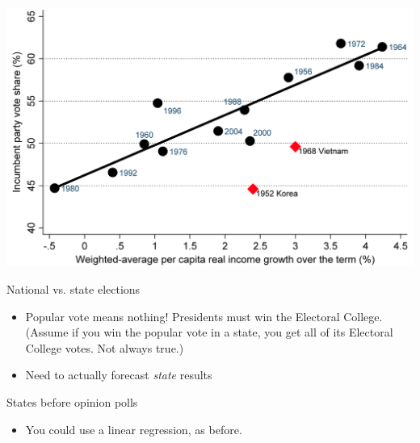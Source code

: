\documentclass[14pt, t]{beamer}
\begin{document}
\begin{frame}[c]
\begin{center}
\includegraphics[width=\textwidth]{bread-and-peace.png}
\end{center}
\end{frame}

\begin{frame}{National vs. state elections}
\begin{itemize}
	\item Popular vote means nothing! Presidents must win the Electoral College. (Assume if you win the popular vote in a state, you get all of its Electoral College votes. Not always true.)
	\item Need to actually forecast \emph{state} results
\end{itemize}
\end{frame}

\begin{frame}{States before opinion polls}
\begin{itemize}
	\item You could use a linear regression, as before.
\end{itemize}
\end{frame}
\end{document}
